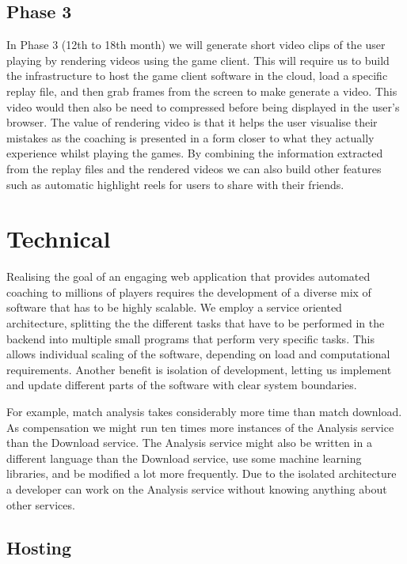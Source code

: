 \documentclass[12pt]{article} %
\let\oldsection\section
\renewcommand\section{\clearpage\oldsection}
\begin{document}
\subsection{Phase 3}

In Phase 3 (12th to 18th month) we will generate short video clips of the user playing by rendering videos using the game client. This will require us to build the infrastructure to host the game client software in the cloud, load a specific replay file, and then grab frames from the screen to make generate a video. This video would then also be need to compressed before being displayed in the user's browser. The value of rendering video is that it helps the user visualise their mistakes as the coaching is presented in a form closer to what they actually experience whilst playing the games. By combining the information extracted from the replay files and the rendered videos we can also build other features such as automatic highlight reels for users to share with their friends.

\section{Technical}

Realising the goal of an engaging web application that provides automated coaching to millions of players requires the development of a diverse mix of software that has to be highly scalable. We employ a service oriented architecture, splitting the the different tasks that have to be performed in the backend into multiple small programs that perform very specific tasks. This allows individual scaling of the software, depending on load and computational requirements. Another benefit is isolation of development, letting us implement and update different parts of the software with clear system boundaries.

For example, match analysis takes considerably more time than match download. As compensation we might run ten times more instances of the Analysis service than the Download service. The Analysis service might also be written in a different language than the Download service, use some machine learning libraries, and be modified a lot more frequently. Due to the isolated architecture a developer can work on the Analysis service without knowing anything about other services.

\subsection{Hosting}
\end{document}
